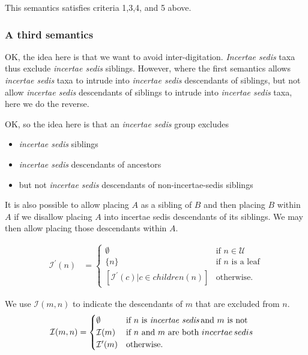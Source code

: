 \documentclass[english]{article}
\begin{document}
This semantics satisfies criteria 1,3,4, and 5 above.

\subsubsection{A third semantics}


OK, the idea here is that we want to avoid inter-digitation.
\emph{Incertae sedis} taxa thus exclude\emph{ incertae sedis}
siblings.
However, where the first semantics allows \emph{incertae
sedis }taxa to intrude into \emph{incertae sedis} descendants of
siblings, but not allow\emph{ incertae sedis} descendants of siblings
to intrude into \emph{incertae sedis} taxa, here we do the reverse.

OK, so the idea here is that an\emph{ incertae sedis} group excludes
\begin{itemize} \item \emph{incertae sedis} siblings \item
\emph{incertae sedis }descendants of ancestors \item but not\emph{
incertae sedis} descendants of non-incertae-sedis siblings
\end{itemize} It is also possible to allow placing $A$ as a sibling of
$B$ and then placing $B$ within $A$ if we disallow placing $A$ into
incertae sedis descendants of its siblings.
We may then allow placing
those descendants within $A$.

\begin{align*} \mathcal{I^{\prime}}(n) & =\begin{cases} \emptyset &
\text{if }n\in\mathcal{U}\\ \{n\} & \text{if }n\text{ is a leaf}\\{}
[\mathcal{I}^{\prime}(c)|c\in children(n)] & \text{otherwise.}
\end{cases} \end{align*}

We use $\mathcal{I}(m,n)$ to indicate the descendants of $m$ that are
excluded from $n$.
\begin{align*} \mathcal{I}(m,n) & =\begin{cases}
\emptyset & \text{if }n\text{ is \emph{incertae sedis}\,and }m\text{
is not}\\ \mathcal{I}(m) & \text{if }n\text{ and }m\text{ are both
}incertae\,sedis\\ \mathcal{I}^{\prime}(m) & \text{otherwise.}
\end{cases} \end{align*}
\end{document}
